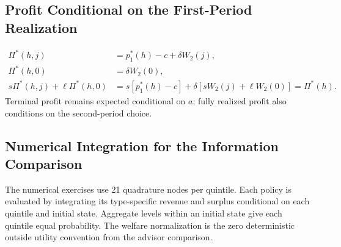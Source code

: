 \documentclass[12pt]{article}
\theoremstyle{definition}
\theoremstyle{remark}
\begin{document}
\subsection{Profit Conditional on the First-Period Realization}
\begin{align}
 \Pi^*(h,j)&=p_1^*(h)-c+\delta W_2(j),\\
 \Pi^*(h,0)&=\delta W_2(0),\\
 s\Pi^*(h,j)+\ell\Pi^*(h,0)
 &=s[p_1^*(h)-c]+\delta[sW_2(j)+\ell W_2(0)]
 =\Pi^*(h).
\end{align}
Terminal profit remains expected conditional on $a$; fully realized profit also
conditions on the second-period choice.

\subsection{Numerical Integration for the Information Comparison}
The numerical exercises use 21 quadrature nodes per quintile. Each
policy is evaluated by integrating its type-specific revenue and surplus
conditional on each quintile and initial state. Aggregate levels within
an initial state give each quintile equal probability. The welfare
normalization is the zero deterministic outside utility convention
from the advisor comparison.
\end{document}
